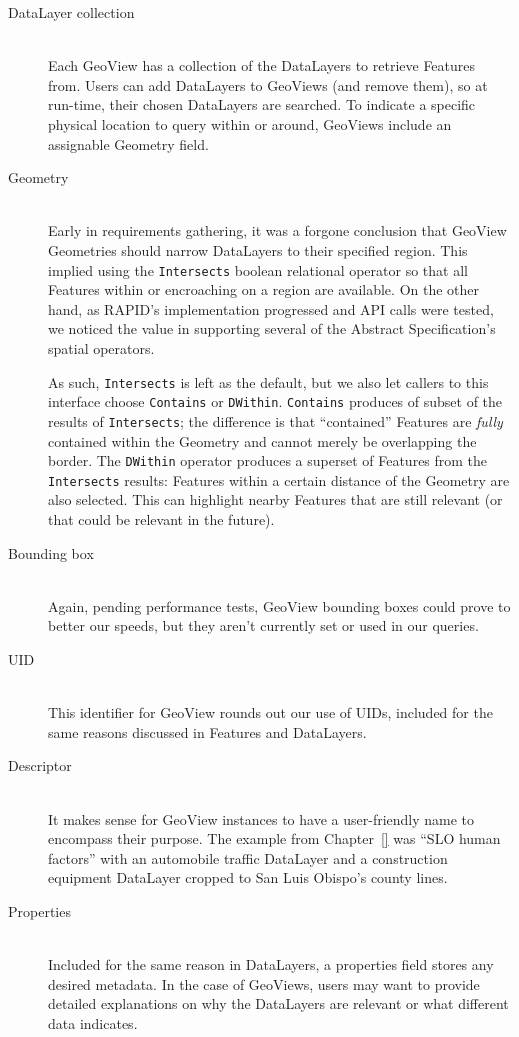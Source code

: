 \begin{description}

\item[DataLayer collection] \hfill \\
Each GeoView has a collection of the DataLayers to retrieve Features from. Users can add DataLayers to GeoViews (and remove them), so at run-time, their chosen DataLayers are searched. To indicate a specific physical location to query within or around, GeoViews include an assignable Geometry field.

\item[Geometry] \hfill \\
Early in requirements gathering, it was a forgone conclusion that GeoView Geometries should narrow DataLayers to their specified region. This implied using the \texttt{Intersects} boolean relational operator so that all Features within or encroaching on a region are available. On the other hand, as RAPID's implementation progressed and API calls were tested, we noticed the value in supporting several of the Abstract Specification's spatial operators.

As such, \texttt{Intersects} is left as the default, but we also let callers to this interface choose \texttt{Contains} or \texttt{DWithin}. \texttt{Contains} produces of subset of the results of \texttt{Intersects}; the difference is that ``contained'' Features are \textit{fully} contained within the Geometry and cannot merely be overlapping the border. The \texttt{DWithin} operator produces a superset of Features from the \texttt{Intersects} results: Features within a certain distance of the Geometry are also selected. This can highlight nearby Features that are still relevant (or that could be relevant in the future).

\item[Bounding box] \hfill \\
Again, pending performance tests, GeoView bounding boxes could prove to better our speeds, but they aren't currently set or used in our queries.

\item[UID] \hfill \\
This identifier for GeoView rounds out our use of UIDs, included for the same reasons discussed in Features and DataLayers.

\item[Descriptor] \hfill \\
It makes sense for GeoView instances to have a user-friendly name to encompass their purpose. The example from Chapter~\ref{} was ``SLO human factors'' with an automobile traffic DataLayer and a construction equipment DataLayer cropped to San Luis Obispo's county lines.

\item[Properties] \hfill \\
Included for the same reason in DataLayers, a properties field stores any desired metadata. In the case of GeoViews, users may want to provide detailed explanations on why the DataLayers are relevant or what different data indicates.

\end{description}


